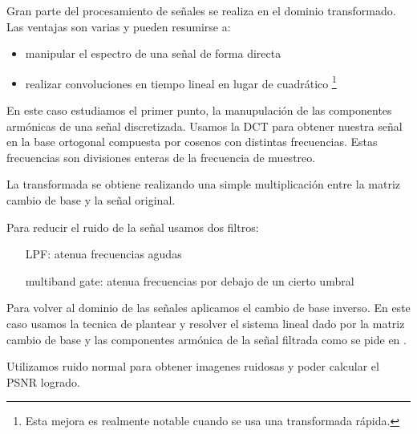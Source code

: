 \PARstart Gran parte del procesamiento de se\~nales se realiza en el
dominio transformado. Las ventajas son varias y pueden resumirse
a:

\begin{itemize}
	\item manipular el espectro de una se\~nal de forma directa
	\item realizar convoluciones en tiempo lineal en lugar
	de cuadr\'atico \footnote{Esta mejora es realmente notable
	cuando se usa una transformada r\'apida.}
\end{itemize}

En este caso estudiamos el primer punto, la manupulaci\'on de las
componentes arm\'onicas de una se\~nal discretizada. Usamos la DCT
para obtener nuestra se\~nal en la base ortogonal compuesta por
cosenos con distintas frecuencias. Estas frecuencias son divisiones
enteras de la frecuencia de muestreo\cite{paper}.

La transformada se obtiene realizando una simple multiplicaci\'on
entre la matriz cambio de base y la se\~nal original.

Para reducir el ruido de la se\~nal usamos dos filtros:
\begin{itemize}
	\item[LPF:] atenua frecuencias agudas
	\item[multiband gate:] atenua frecuencias por debajo de un cierto
	umbral
\end{itemize}

Para volver al dominio de las se\~nales aplicamos el cambio de
base inverso\cite{paper}. En este caso usamos la tecnica de plantear y
resolver el
sistema lineal dado por la matriz cambio de base y las componentes
arm\'onica de la se\~nal filtrada como se pide en \cite{enunciado}.

Utilizamos ruido normal para obtener imagenes ruidosas y poder calcular
el PSNR logrado.
